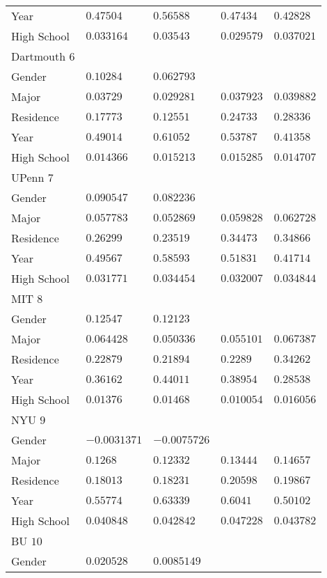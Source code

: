 \begin{center}
\begin{longtable}{|l|l|l|l|l|}
Year & $0.47504$ & $0.56588$ & $0.47434$ & $0.42828$ \\
High School & $0.033164$ & $0.03543$ & $0.029579$ & $0.037021$ \\ \hline \hline
Dartmouth $6$ & & &   \\ \hline
Gender & $0.10284$ & $0.062793$ & & \\
Major & $0.03729$ & $0.029281$ & $0.037923$ & $0.039882$ \\
Residence & $0.17773$ & $0.12551$ & $0.24733$ & $0.28336$ \\
Year & $0.49014$ & $0.61052$ & $0.53787$ & $0.41358$ \\
High School & $0.014366$ & $0.015213$ & $0.015285$ & $0.014707$ \\ \hline \hline
UPenn $7$ & & &   \\ \hline
Gender & $0.090547$ & $0.082236$ & & \\
Major & $0.057783$ & $0.052869$ & $0.059828$ & $0.062728$ \\
Residence & $0.26299$ & $0.23519$ & $0.34473$ & $0.34866$ \\
Year & $0.49567$ & $0.58593$ & $0.51831$ & $0.41714$ \\
High School & $0.031771$ & $0.034454$ & $0.032007$ & $0.034844$ \\ \hline \hline
MIT $8$ & & &   \\ \hline
Gender & $0.12547$ & $0.12123$ & & \\
Major & $0.064428$ & $0.050336$ & $0.055101$ & $0.067387$ \\
Residence & $0.22879$ & $0.21894$ & $0.2289$ & $0.34262$ \\
Year & $0.36162$ & $0.44011$ & $0.38954$ & $0.28538$ \\
High School & $0.01376$ & $0.01468$ & $0.010054$ & $0.016056$ \\ \hline \hline
NYU $9$ & & &   \\ \hline
Gender & $-0.0031371$ & $-0.0075726$ & & \\
Major & $0.1268$ & $0.12332$ & $0.13444$ & $0.14657$ \\
Residence & $0.18013$ & $0.18231$ & $0.20598$ & $0.19867$ \\
Year & $0.55774$ & $0.63339$ & $0.6041$ & $0.50102$ \\
High School & $0.040848$ & $0.042842$ & $0.047228$ & $0.043782$ \\ \hline \hline
BU $10$ & & &   \\ \hline
Gender & $0.020528$ & $0.0085149$ & & \\

\end{longtable}
\end{center}
